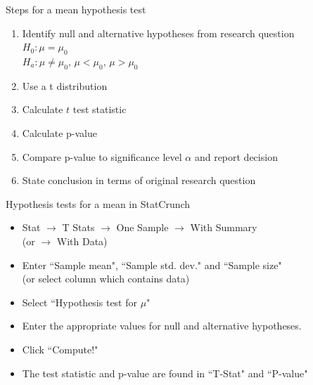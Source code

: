 \documentclass[xcolor=table, handout]{beamer}
\begin{document}
\begin{frame}{Steps for a mean hypothesis test}
\begin{block}{}
\large
\begin{enumerate}
\item Identify null and alternative hypotheses from research question\\
$H_0: \mu = \mu_0$\\
$H_a: \mu \ne \mu_0, \, \mu < \mu_0, \, \mu> \mu_0$
\item Use a t distribution
\item Calculate $t$ test statistic
\item Calculate p-value
\item Compare p-value to significance level $\alpha$ and report decision
\item State conclusion in terms of original research question
\end{enumerate}
\end{block}
\end{frame}

\begin{frame}{Hypothesis tests for a mean in StatCrunch}

\begin{block}{}
\large
\begin{itemize}
\item Stat $\to$ T Stats $\to$ One Sample $\to$ With Summary\\ (or $\to$ With Data)
\item Enter ``Sample mean", ``Sample std. dev." and ``Sample size"\\
(or select column which contains data)
\item Select ``Hypothesis test for $\mu$"
\item Enter the appropriate values for null and alternative hypotheses.
\item Click ``Compute!"
\item The test statistic and p-value are found in ``T-Stat" and ``P-value"
\end{itemize}
\end{block}

\end{frame}
\end{document}
